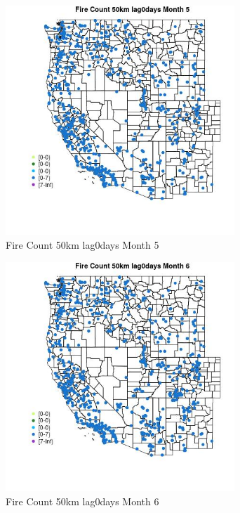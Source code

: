 \begin{figure} 
\centering  
\includegraphics[width=0.77\textwidth]{Code_Outputs/Report_ML_input_PM25_Step4_part_e_de_duplicated_aves_compiled_2019-05-21wNAs_MapObsMo5Fire_Count_50km_lag0days.jpg} 
\caption{\label{fig:Report_ML_input_PM25_Step4_part_e_de_duplicated_aves_compiled_2019-05-21wNAsMapObsMo5Fire_Count_50km_lag0days}Fire Count 50km lag0days Month 5} 
\end{figure} 
 

\clearpage 

\begin{figure} 
\centering  
\includegraphics[width=0.77\textwidth]{Code_Outputs/Report_ML_input_PM25_Step4_part_e_de_duplicated_aves_compiled_2019-05-21wNAs_MapObsMo6Fire_Count_50km_lag0days.jpg} 
\caption{\label{fig:Report_ML_input_PM25_Step4_part_e_de_duplicated_aves_compiled_2019-05-21wNAsMapObsMo6Fire_Count_50km_lag0days}Fire Count 50km lag0days Month 6} 
\end{figure} 
 

